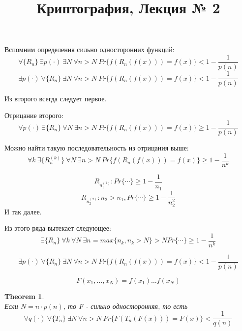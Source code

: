 \documentclass[a4paper]{article}
\title{Криптография, Лекция № 2}
\theoremstyle{definition}
\theoremstyle{plain}
\newtheorem{theorem}{Theorem}
\begin{document}
\maketitle

\noindent Вспомним определения сильно односторонних функций:
$$
	\forall \{R_n\}\ \exists p(\cdot)\ \exists N\ \forall n > N\ Pr\{f(R_n(f(x))) = f(x)\} < 1 - \frac{1}{p(n)}
$$ 
$$
	\exists p(\cdot)\ \forall \{R_n\}\ \exists N\ \forall n > N\ Pr\{f(R_n(f(x))) = f(x)\} < 1 - \frac{1}{p(n)}
$$ 

\noindent Из второго всегда следует первое.

\noindent Отрицание второго:
$$
	\forall p(\cdot)\ \exists \{R_n\}\ \forall N\ \exists n > N\ Pr\{f(R_n(f(x))) = f(x)\} \ge 1 - \frac{1}{p(n)}
$$ 

\noindent Можно найти такую последовательность из отрицания выше:
$$
	\forall k\ \exists \{R_n^{(k)}\}\ \forall N\ \exists n > N\ Pr\{f(R_n(f(x))) = f(x)\} \ge 1 - \frac{1}{n^k}
$$

$$
	R_{n_1^{(1)}} \colon Pr\{\cdots\} \ge 1 - \frac{1}{n_1}
$$
$$
	R_{n_2^{(2)}} \colon n_2 > n_1, Pr\{\cdots\} \ge 1 - \frac{1}{n_2^2}
$$
\noindent И так далее.

\noindent Из этого ряда вытекает следующее:
$$
	\exists \{R_{n}\}\ \forall k\ \forall N\ \exists n = max\{n_k, n_k > N\} > N Pr\{\cdots\} \ge 1 - \frac{1}{n^k}
$$

$$
	\exists p(\cdot)\ \forall \{R_n\}\ \exists N\ \forall n > N\ Pr\{f(R_n(f(x))) = f(x)\} < 1 - \frac{1}{p(n)}
$$

$$
	F(x_1, \ldots, x_N) = f(x_1)\ldots f(x_N)
$$

\begin{theorem}~\\
	Если $N = n \cdot p(n)$, то $F$ - сильно односторонняя, то есть
	$$
		\forall q(\cdot)\ \forall\{T_n\}\ \exists N\ \forall n > N\ Pr\{F(T_n(F(x))) = F(x)\} < \frac{1}{q(n)}
	$$
\end{theorem}
\end{document}
